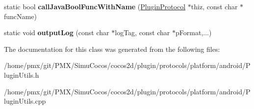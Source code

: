 \begin{DoxyCompactItemize}
\item 
\mbox{\label{classcocos2d_1_1plugin_1_1PluginUtils_a5b8c8b9f74ff0398e8d132ec3d088b62}} 
static bool {\bfseries call\+Java\+Bool\+Func\+With\+Name} (\hyperlink{classcocos2d_1_1plugin_1_1PluginProtocol}{Plugin\+Protocol} $\ast$thiz, const char $\ast$func\+Name)
\item 
\mbox{\label{classcocos2d_1_1plugin_1_1PluginUtils_a0e2258bcfcf71bf09abbba1ccfe96601}} 
static void {\bfseries output\+Log} (const char $\ast$log\+Tag, const char $\ast$p\+Format,...)
\end{DoxyCompactItemize}


The documentation for this class was generated from the following files\+:\begin{DoxyCompactItemize}
\item 
/home/pmx/git/\+P\+M\+X/\+Simu\+Cocos/cocos2d/plugin/protocols/platform/android/Plugin\+Utils.\+h\item 
/home/pmx/git/\+P\+M\+X/\+Simu\+Cocos/cocos2d/plugin/protocols/platform/android/Plugin\+Utils.\+cpp\end{DoxyCompactItemize}
